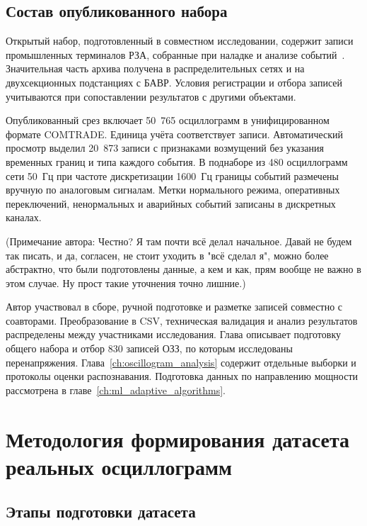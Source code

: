 \subsection{Состав опубликованного набора}\label{subsec:dataset_published_scope}
Открытый набор, подготовленный в совместном исследовании, содержит записи промышленных
терминалов РЗА, собранные при наладке и анализе
событий~\cite{evdakov_oscillograms_2026}. Значительная часть архива получена в
распределительных сетях и на двухсекционных подстанциях с БАВР. Условия регистрации и
отбора записей учитываются при сопоставлении результатов с другими объектами.

Опубликованный срез включает 50~765 осциллограмм в унифицированном формате COMTRADE. Единица учёта соответствует записи. Автоматический просмотр выделил 20~873 записи с признаками возмущений без указания временных границ и типа каждого события. В поднаборе из 480 осциллограмм сети 50~Гц при частоте дискретизации 1600~Гц границы событий размечены вручную по аналоговым сигналам. Метки нормального режима, оперативных переключений, ненормальных и аварийных событий записаны в дискретных каналах.

(Примечание автора: Честно? Я там почти всё делал начальное. Давай не будем так писать, и да, согласен, не стоит уходить в "всё сделал я", можно более абстрактно, что были подготовлены данные, а кем и как, прям вообще не важно в этом случае. Ну прост такие уточнения точно лишние.)

Автор участвовал в сборе, ручной подготовке и разметке записей совместно с соавторами. Преобразование в CSV, техническая валидация и анализ результатов распределены между участниками исследования. Глава описывает подготовку общего набора и отбор 830 записей ОЗЗ, по которым исследованы перенапряжения. Глава~\ref{ch:oscillogram_analysis} содержит отдельные выборки и протоколы оценки распознавания. Подготовка данных по направлению мощности рассмотрена в главе~\ref{ch:ml_adaptive_algorithms}.

\section{Методология формирования датасета реальных осциллограмм}\label{sec:dataset_methodology}

\subsection{Этапы подготовки датасета}\label{subsec:dataset_stages}

